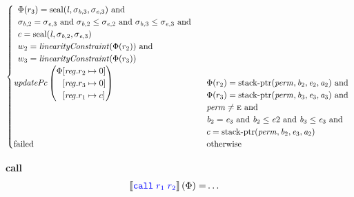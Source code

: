 \documentclass[a4paper]{article}
\newcommand{\sem}[1]{\left\llbracket #1 \right\rrbracket}
\newcommand{\tand}{\text{ and }}
\newcommand{\totherwise}{\text{otherwise }}
\newcommand{\sourcecolor}[1]{\color{blue}}
\newcommand{\src}[1]{{\sourcecolor{} #1}}
\newcommand{\zinstr}[1]{\texttt{#1}}
\newcommand{\twoinstr}[3]{
  \ifthenelse{\equal{#2#3}{}}
  {\zinstr{#1}}
  {\zinstr{#1} \; #2 \; #3}
}
\newcommand{\scall}[2]{\twoinstr{\src{call}}{#1}{#2}}
\newcommand{\update}[2]{[#1 \mapsto #2]}
\newcommand{\updReg}[2]{\update{\reg.#1}{#2}}
\newcommand{\shareddom}[1]{\mathrm{#1}}
\newcommand{\perm}{\var{perm}}
\newcommand{\lin}{\var{l}}
\newcommand{\stkptr}[1]{\mathrm{stack\text{-}ptr}(#1)}
\newcommand{\seal}[1]{\shareddom{seal}(#1)}
\newcommand{\failed}{\mathrm{failed}}
\newcommand{\var}[1]{\mathit{#1}}
\newcommand{\reg}{\var{reg}}
\newcommand{\baddr}{\var{b}}
\newcommand{\eaddr}{\var{e}}
\newcommand{\aaddr}{\var{a}}
\newcommand{\plainperm}[1]{\textsc{#1}}
\newcommand{\enter}{\plainperm{e}}
\newcommand{\plainfun}[2]{
  \ifthenelse{\equal{#2}{}}
  {\mathit{#1}}
  {\mathit{#1}(#2)}
}
\newcommand{\updPcAddr}[1]{\plainfun{updatePc}{#1}}
\newcommand{\linCons}[1]{\plainfun{linearityConstraint}{#1}}
\begin{document}
\begin{align*}
\begin{cases}
\begin{array}[t]{l}
                                  \Phi(r_3) = \seal{\lin,\sigma_{\baddr,3},\sigma_{\eaddr,3}} \tand \\
                                  \sigma_{\baddr,2} = \sigma_{\eaddr,3} \tand \sigma_{\baddr,2} \leq \sigma_{\eaddr,2} \tand \sigma_{\baddr,3} \leq \sigma_{\eaddr,3} \tand \\
                                  c = \seal{\lin,\sigma_{\baddr,2},\sigma_{\eaddr,3}} \\
                                  w_2 = \linCons{\Phi(r_2)} \tand \\
                                  w_3 = \linCons{\Phi(r_3)} \\
                                \end{array}\\
                                \updPcAddr{}\left(
                                \arraycolsep=0pt
                                \begin{array}{r l}
                                  \Phi&\updReg{r_2}{0}\\
                                      &\updReg{r_3}{0}\\
                                      &\updReg{r_1}{c}
                                \end{array}\right)
&
                                \arraycolsep=0pt
                                \begin{array}[t]{l}
                                  \Phi(r_2) = \stkptr{\perm,\baddr_2,\eaddr_2,\aaddr_2} \tand \\
                                  \Phi(r_3) = \stkptr{\perm,\baddr_3,\eaddr_3,\aaddr_3} \tand \\
                                  \perm \neq \enter \tand \\
                                  \baddr_2 = \eaddr_3 \tand \baddr_2 \leq \eaddr2 \tand \baddr_3 \leq \eaddr_3 \tand \\
                                  c = \stkptr{\perm,\baddr_2,\eaddr_3,\aaddr_2} \\
                                \end{array}\\
                                \failed & \totherwise
                              \end{cases}
\end{align*}

\noindent\textbf{call}\\
\begin{align*}
  \sem{\scall{\src{r_1}}{\src{r_2}}}(\Phi) = & \dots
\end{align*}
\end{document}
